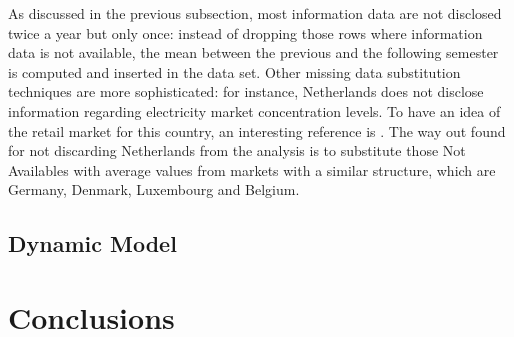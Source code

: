 \documentclass{book}
\begin{document}
As discussed in the previous subsection, most information data are not disclosed twice a year but only once: instead of dropping those rows where information data is not available, the mean between the previous and the following semester is computed and inserted in the data set. Other missing data substitution techniques are more sophisticated: for instance, Netherlands does not disclose information regarding electricity market concentration levels. To have an idea of the retail market for this country, an interesting reference is \cite{mulder2019dutch}.  The way out found for not discarding Netherlands from the analysis is to substitute those Not Availables with average values from markets with a similar structure, which are Germany, Denmark, Luxembourg and Belgium.
\section*{Dynamic Model}

\chapter{Conclusions}
\end{document}
